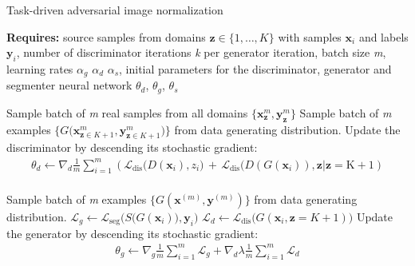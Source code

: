 \documentclass[preprint,12pt]{elsarticle}
\renewcommand{\vec}[1]{\mathbf{#1}}
\newcommand{\mr}[1]{\mathrm{#1}}
\newcommand{\yy}{\vec{y}}
\newcommand{\xx}{\vec{x}}
\newcommand{\zz}{\vec{z}}
\newcommand{\loss}{\mathcal{L}}
\newcommand{\lossSeg}{\loss_{\mr{seg}}}
\newcommand{\lossDis}{\loss_{\mr{dis}}}
\begin{document}
\begin{algorithm}
\caption{Task-driven adversarial image normalization}
\textbf{Requires:} source samples from domains $\zz \in \{1, \ldots, K\}$ with samples $\xx_i$ and labels $\yy_i$, number of discriminator iterations \emph{k} per generator iteration, batch size \emph{m}, learning rates $\alpha_g$ $\alpha_d$ $\alpha_s$, initial parameters for the discriminator, generator and segmenter neural network $\theta_d$, $\theta_g$, $\theta_s$
    \begin{algorithmic}
            \State Sample batch of \emph{m} real samples from all domains $\big\{\xx^{m}_\zz, \yy^{m}_\zz\big\}$
            \State Sample batch of \emph{m} examples $\big\{G \big(\xx^{m}_{\zz \in K+1}, \yy^{m}_{\zz \in K+1}\big)\big\}$ from data generating distribution.
            \State Update the discriminator by descending its stochastic gradient: \\
            \begin{align*}
            \theta_d \gets {\nabla_d} \frac{1}{m} \sum_{i=1}^{m} ( \lossDis\big(D(\xx_i), z_i\big) \, + \, \lossDis\big(D(G(\xx_i)), \mr{\zz | \zz = K+1})
            \end{align*}
        \EndFor
        \\
        \State Sample batch of \emph{m} examples $\{G(\xx^{(m)}, \yy^{(m)})\}$ from data generating distribution.
        \State $\loss_g \gets \lossSeg \big(S \big(G(\xx_i) \big), \yy_i \big)$
        \State $\loss_d \gets \lossDis \big(G(\xx_i, \zz = K+1)\big)$
        \State Update the generator by descending its stochastic gradient: \\
        \begin{align*}
            \theta_g \gets \nabla_g \frac{1}{m} \sum_{i=1}^{m} \loss_g + \nabla_d \lambda \frac{1}{m} \sum_{i=1}^{m} \loss_d
        \end{align*}
    \EndFor
    \end{algorithmic}
\label{alg:deepNormalize}
\end{algorithm}
\end{document}
